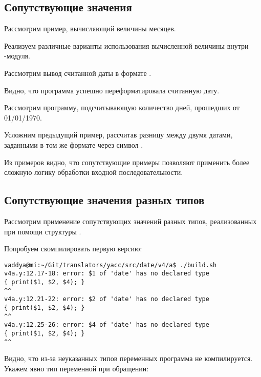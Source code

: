 \subsection{Сопутствующие значения}

Рассмотрим пример, вычисляющий величины месяцев.


Реализуем различные варианты использования вычисленной величины внутри -модуля.

Рассмотрим вывод считанной даты в формате .



Видно, что программа успешно переформатировала считанную дату.

Рассмотрим программу, подсчитывающую количество дней, прошедших от 01/01/1970.



Усложним предыдущий пример, рассчитав разницу между двумя датами, заданными в том же формате через символ .



Из примеров видно, что сопутствующие примеры позволяют применить более сложную логику обработки входной последовательности.

\subsection{Сопутствующие значения разных типов}

Рассмотрим применение сопутствующих значений разных типов, реализованных при помощи структуры .


Попробуем скомпилировать первую версию:
\begin{lstlisting}
vaddya@mi:~/Git/translators/yacc/src/date/v4/a$ ./build.sh 
v4a.y:12.17-18: error: $1 of 'date' has no declared type
{ print($1, $2, $4); }
^^
v4a.y:12.21-22: error: $2 of 'date' has no declared type
{ print($1, $2, $4); }
^^
v4a.y:12.25-26: error: $4 of 'date' has no declared type
{ print($1, $2, $4); }
^^
\end{lstlisting}

Видно, что из-за неуказанных типов переменных программа не компилируется. Укажем явно тип переменной при обращении:

